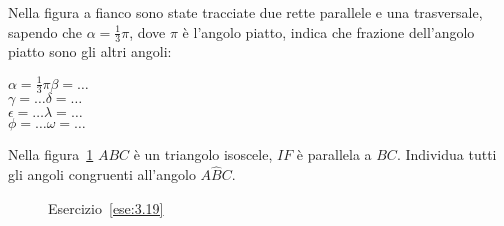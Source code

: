 \begin{esercizio}
\label{ese:3.18}
Nella figura a fianco sono state tracciate due rette parallele e una trasversale, sapendo che $\alpha=\frac{1}{3}\pi$, dove $\pi$ è l'angolo piatto, indica che frazione dell'angolo piatto sono gli altri angoli:\\
\noindent\begin{minipage}{.5\textwidth}
$\alpha=\frac{1}{3}\pi$\tab\tab $\beta = \ldots$\\
$\gamma=\ldots$\tab\tab $\delta = \ldots$\\
$\epsilon=\ldots$\tab\tab $\lambda = \ldots$\\
$\phi=\ldots$\tab\tab $\omega = \ldots$
\end{minipage}\hfil
\begin{minipage}{.5\textwidth}
\centering
\end{minipage}
\end{esercizio}

\begin{esercizio}
\label{ese:3.19}
Nella figura~\ref{fig:ese3.19} $ABC$ è un triangolo isoscele, $IF$ è parallela a $BC$. Individua tutti gli angoli congruenti all'angolo $A\widehat{B}C$.
\end{esercizio}
\begin{figure}[htb]
\centering
\caption{Esercizio~\ref{ese:3.19}}\label{fig:ese3.19}
\end{figure}

